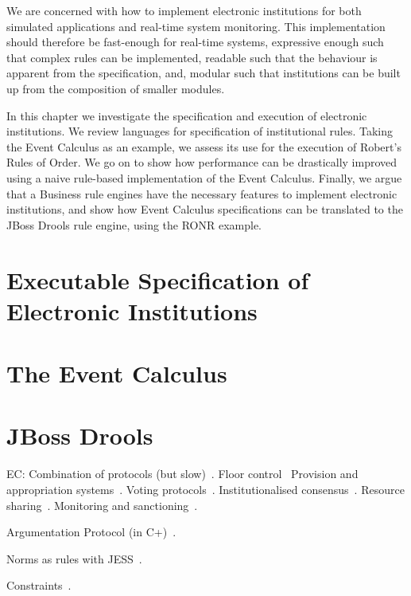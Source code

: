 We are concerned with how to implement electronic institutions for both
simulated applications and real-time system monitoring. This implementation
should therefore be fast-enough for real-time systems, expressive enough such
that complex rules can be implemented, readable such that the behaviour is
apparent from the specification, and, modular such that institutions can be
built up from the composition of smaller modules.

In this chapter we investigate the specification and execution of electronic
institutions. We review languages for specification of institutional rules.
Taking the Event Calculus as an example, we assess its use for the execution of
Robert's Rules of Order. We go on to show how performance can be drastically
improved using a naive rule-based implementation of the Event Calculus. Finally,
we argue that a Business rule engines have the necessary features to implement
electronic institutions, and show how Event Calculus specifications can be
translated to the JBoss Drools rule engine, using the \ac{RONR} example. 

\section{Executable Specification of Electronic Institutions}



\section{The Event Calculus}

\section{JBoss Drools}

EC: 
Combination of protocols (but slow)~\citep{Carr2012}. 
Floor control~
Provision and appropriation systems~\citep{Pitt2012}. 
Voting protocols~\citep{Pitt2005a}. 
Institutionalised consensus~\citep{Sanderson2012}. 
Resource sharing~\citep{Artikis2005}.
Monitoring and sanctioning~\citep{Pitt2012c}. 

Argumentation Protocol (in C+)~\citep{Artikis2003}.

Norms as rules with JESS~\citep{Garcia-Camino2005}.

Constraints~\citep{Aldewereld2007}.



